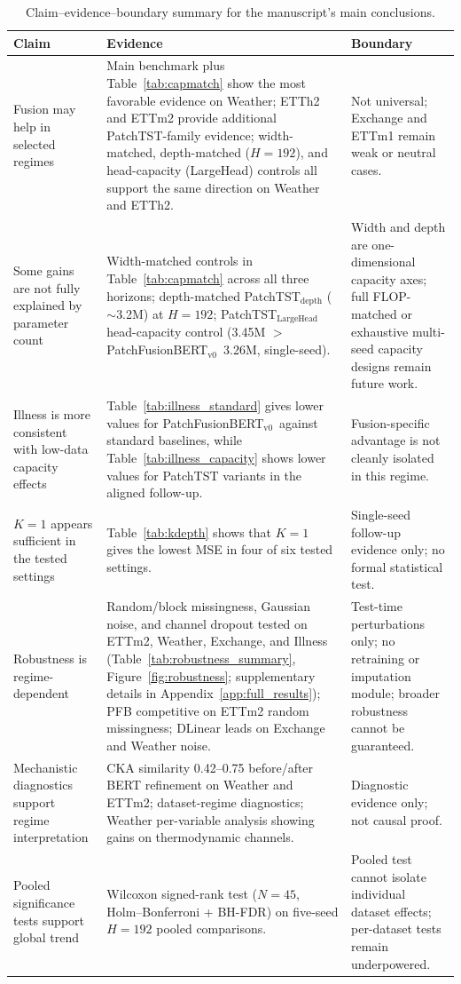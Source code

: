\documentclass{ieeeaccess}
\newcommand{\modelvzero}{PatchFusionBERT$_{\text{v0}}$\xspace}
\begin{document}
\begin{table}[t]
\centering
\caption{Claim--evidence--boundary summary for the manuscript's main conclusions.}
\label{tab:claims}
\small
\begin{tabular}{@{}p{}p{}p{}@{}}
\toprule
Claim & Evidence & Boundary \\
\midrule
Fusion may help in selected regimes & Main benchmark plus Table~\ref{tab:capmatch}
show the most favorable evidence on Weather; ETTh2 and ETTm2 provide additional
PatchTST-family evidence; width-matched, depth-matched ($H=192$), and head-capacity
(LargeHead) controls all support the same direction on Weather and ETTh2. & Not universal; Exchange and ETTm1 remain weak or
neutral cases. \\
Some gains are not fully explained by parameter count & Width-matched controls in Table~\ref{tab:capmatch}
across all three horizons; depth-matched PatchTST$_\text{depth}$ ($\sim$3.2M) at $H=192$;
PatchTST$_\text{LargeHead}$ head-capacity control (3.45M $>$ \modelvzero\ 3.26M, single-seed).
& Width and depth are one-dimensional capacity axes; full FLOP-matched or
exhaustive multi-seed capacity designs remain future work. \\
Illness is more consistent with low-data capacity effects & Table~\ref{tab:illness_standard}
gives lower values for \modelvzero\ against standard baselines, while Table~\ref{tab:illness_capacity}
shows lower values for PatchTST variants in the aligned follow-up. & Fusion-specific advantage is not
cleanly isolated in this regime. \\
$K=1$ appears sufficient in the tested settings & Table~\ref{tab:kdepth} shows that $K=1$ gives the
lowest MSE in four of six tested settings. & Single-seed follow-up evidence only; no
formal statistical test. \\
Robustness is regime-dependent & Random/block missingness, Gaussian noise, and channel
dropout tested on ETTm2, Weather, Exchange, and Illness (Table~\ref{tab:robustness_summary},
Figure~\ref{fig:robustness}; supplementary details in Appendix~\ref{app:full_results});
PFB competitive on ETTm2 random missingness; DLinear leads on Exchange and Weather
noise. & Test-time perturbations only; no
retraining or imputation module; broader robustness cannot be guaranteed. \\
Mechanistic diagnostics support regime interpretation & CKA similarity 0.42--0.75
before/after BERT refinement on Weather and ETTm2; dataset-regime diagnostics;
Weather per-variable analysis showing gains on thermodynamic channels. & Diagnostic
evidence only; not causal proof. \\
Pooled significance tests support global trend & Wilcoxon signed-rank test ($N=45$,
Holm--Bonferroni + BH-FDR) on five-seed $H=192$ pooled comparisons. & Pooled
test cannot isolate individual dataset effects; per-dataset tests remain
underpowered. \\
\bottomrule
\end{tabular}
\end{table}
\end{document}
